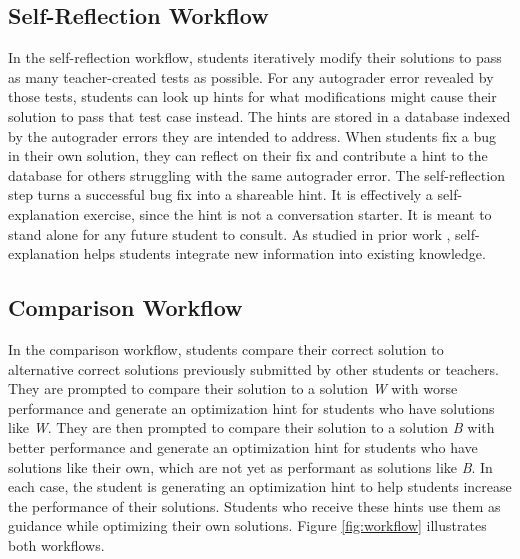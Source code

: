 \subsection{Self-Reflection Workflow} 

In the self-reflection workflow, students iteratively modify their solutions to pass as many teacher-created tests as possible. For any autograder error revealed by those tests, students can look up hints for what modifications might cause their solution to pass that test case instead. The hints are stored in a database indexed by the autograder errors they are intended to address. When students fix a bug in their own solution, they can reflect on their fix and contribute a hint to the database for others struggling with the same autograder error. The self-reflection step turns a successful bug fix into a shareable hint. It is effectively a self-explanation exercise, since the hint is not a conversation starter. It is meant to stand alone for any future student to consult. As studied in prior work \cite{selfexplanation}, self-explanation helps students integrate new information into existing knowledge.

\subsection{Comparison Workflow} 

In the comparison workflow, students compare their correct solution to alternative correct solutions previously submitted by other students or teachers. They are prompted to compare their solution to a solution \textit{W} with worse performance and generate an optimization hint for students who have solutions like \textit{W}. They are then prompted to compare their solution to a solution \textit{B} with better performance and generate an optimization hint for students who have solutions like their own, which are not yet as performant as solutions like \textit{B}. In each case, the student is generating an optimization hint to help students increase the performance of their solutions. Students who receive these hints use them as guidance while optimizing their own solutions. Figure \ref{fig:workflow} illustrates both workflows.

